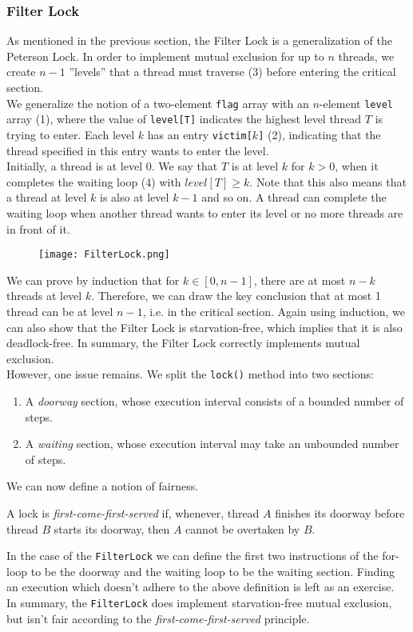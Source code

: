 \documentclass[main]{subfiles}
\begin{document}
\subsubsection{Filter Lock} \label{Filter Lock}
As mentioned in the previous section, the Filter Lock is a generalization of the Peterson Lock. In order to implement mutual exclusion for up to $n$ threads, we create $n-1$ ''levels'' that a thread must traverse (3) before entering the critical section. \\[3mm]
We generalize the notion of a two-element \texttt{flag} array with an $n$-element \texttt{level} array (1), where the value of \texttt{level[T]} indicates the highest level thread $T$ is trying to enter. Each level $k$ has an entry \texttt{victim[$k$]} (2), indicating that the thread specified in this entry wants to enter the level.\\[3mm]
Initially, a thread is at level 0. We say that $T$ is at level $k$ for $k>0$, when it completes the waiting loop (4) with $level[T]\geq k$. Note that this also means that a thread at level $k$ is also at level $k-1$ and so on. A thread can complete the waiting loop when another thread wants to enter its level or no more threads are in front of it.\\[3mm]
\begin{figure}[H]
    \centering
    \texttt{[image: FilterLock.png]}
\end{figure}
\noindent We can prove by induction that for $k \in [0,n-1]$, there are at most $n-k$ threads at level $k$. Therefore, we can draw the key conclusion that at most 1 thread can be at level $n-1$, i.e. in the critical section. Again using induction, we can also show that the Filter Lock is starvation-free, which implies that it is also deadlock-free. In summary, the Filter Lock correctly implements mutual exclusion.\\[3mm]
However, one issue remains. We split the \texttt{lock()} method into two sections:
\begin{enumerate}
    \item A \textit{doorway} section, whose execution interval consists of a bounded number of steps.
    \item A \textit{waiting} section, whose execution interval may take an unbounded number of steps.
\end{enumerate}
We can now define a notion of fairness.
\begin{definition}
    A lock is \textit{first-come-first-served} if, whenever, thread $A$ finishes its doorway before thread $B$ starts its doorway, then $A$ cannot be overtaken by $B$.
\end{definition}
In the case of the \texttt{FilterLock} we can define the first two instructions of the for-loop to be the doorway and the waiting loop to be the waiting section. Finding an execution which doesn't adhere to the above definition is left as an exercise.\\[3mm]
In summary, the \texttt{FilterLock} does implement starvation-free mutual exclusion, but isn't fair according to the \textit{first-come-first-served} principle.
\end{document}
